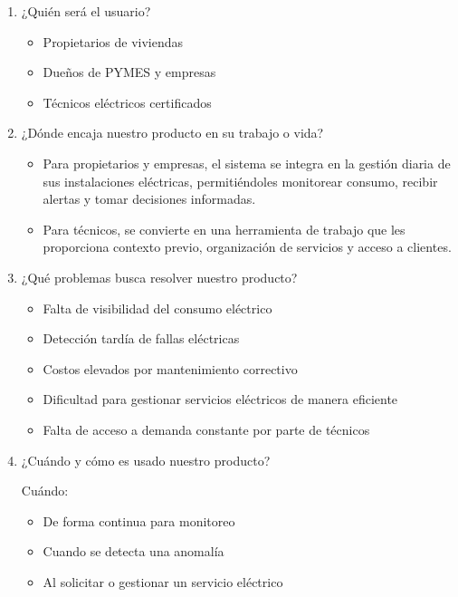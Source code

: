 \begin{enumerate}
\def\labelenumi{\arabic{enumi}.}
\item
  ¿Quién será el usuario?

  \begin{itemize}
  \tightlist
  \item
    Propietarios de viviendas
  \item
    Dueños de PYMES y empresas
  \item
    Técnicos eléctricos certificados
  \end{itemize}
\item
  ¿Dónde encaja nuestro producto en su trabajo o vida?

  \begin{itemize}
  \tightlist
  \item
    Para propietarios y empresas, el sistema se integra en la gestión
    diaria de sus instalaciones eléctricas, permitiéndoles monitorear
    consumo, recibir alertas y tomar decisiones informadas.
  \item
    Para técnicos, se convierte en una herramienta de trabajo que les
    proporciona contexto previo, organización de servicios y acceso a
    clientes.
  \end{itemize}
\item
  ¿Qué problemas busca resolver nuestro producto?

  \begin{itemize}
  \tightlist
  \item
    Falta de visibilidad del consumo eléctrico
  \item
    Detección tardía de fallas eléctricas
  \item
    Costos elevados por mantenimiento correctivo
  \item
    Dificultad para gestionar servicios eléctricos de manera eficiente
  \item
    Falta de acceso a demanda constante por parte de técnicos
  \end{itemize}
\item
  ¿Cuándo y cómo es usado nuestro producto?

  Cuándo:

  \begin{itemize}
  \tightlist
  \item
    De forma continua para monitoreo
  \item
    Cuando se detecta una anomalía
  \item
    Al solicitar o gestionar un servicio eléctrico
  \end{itemize}


\end{enumerate}
